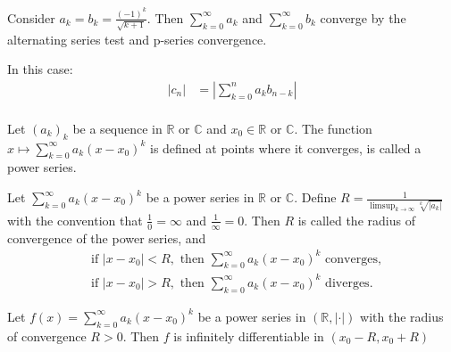 \documentclass{tufte-handout}
\begin{document}
\begin{Example}
    Consider \( a_k=b_k = \frac{(-1)^k}{\sqrt{k+1}} \).
    Then \( \sum_{k=0}^{\infty}a_k \) and \( \sum_{k=0}^{\infty}b_k \) converge by the alternating series test
    and p-series convergence.

    In this case:
    \begin{align}
        |c_n| &= |\sum_{k=0}^{n}a_k b_{n-k}| \\
    \end{align}
\end{Example}


\begin{Definition}
    Let \( (a_k)_k \) be a sequence in \( \mathbb{R} \) or
    \( \mathbb{C} \) and \( x_0 \in \mathbb{R} \) or \( \mathbb{C} \).
    The function \( x \mapsto \sum_{k=0}^{\infty}a_k(x-x_0)^k \) is 
    defined at points where it converges, is called a power series.
\end{Definition}

\begin{Proposition}
    Let \( \sum_{k=0}^{\infty}a_k(x-x_0)^k \) be a power series in \( \mathbb{R} \) or \( \mathbb{C} \).
    Define \(R = \frac{1}{\limsup_{k\to \infty} \sqrt[k]{|a_k|}}\) with the 
    convention that \( \frac{1}{0} = \infty \) and \( \frac{1}{\infty} = 0 \).
    Then \( R \) is called the radius of convergence of the power series, and
    \begin{align}
        &\text{if } |x-x_0| < R, \text{ then } \sum_{k=0}^{\infty}a_k(x-x_0)^k \text{ converges},\\
        &\text{if } |x-x_0| > R, \text{ then } \sum_{k=0}^{\infty}a_k(x-x_0)^k \text{ diverges}.
    \end{align}
\end{Proposition}

\begin{Proposition}
    Let \( f(x) =\sum_{k=0}^{\infty}a_k(x-x_0)^k \) be a power series in \( (\mathbb{R}, |\cdot|) \) 
    with the radius of convergence \( R > 0 \). 
    Then \( f \) is infinitely differentiable in \( (x_0 - R, x_0 + R) \) 
    
\end{Proposition}
\end{document}
